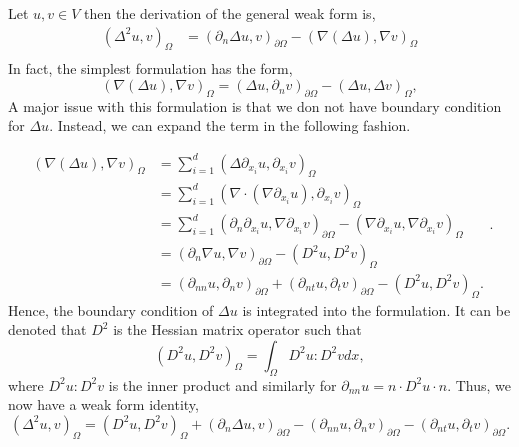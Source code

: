Let $u,v \in  V$ then the derivation of the general weak form is,
\[
\begin{split}
\left( \Delta ^2 u,v \right) _{\Omega }  &  = \left( \partial _{n} \Delta u, v \right) _{\partial \Omega } - \left( \nabla \left( \Delta  u \right) , \nabla v \right) _{\Omega }  \\
\end{split}
\]
In fact, the simplest formulation has the form,
\[
  \left( \nabla \left( \Delta u \right) , \nabla v \right) _{\Omega } =   \left( \Delta u, \partial _{n} v \right) _{\partial \Omega } - \left( \Delta u, \Delta v \right)_{\Omega },
\]
A major issue with this formulation is that we don not have boundary condition for $\Delta u$. Instead, we can expand the term in the following fashion.

\begin{equation*}
    \begin{split}
\left( \nabla \left( \Delta u \right) , \nabla v \right) _{\Omega } & = \sum_{i = 1}^{ d}  \left( \Delta  \partial _{x_{i}} u, \partial _{x_{i}}v \right) _{\Omega }  \\
&= \sum_{i = 1}^{d}  \left( \nabla \cdot \left( \nabla \partial _{x_{i}} u \right) , \partial _{x_{i}} v \right)_{\Omega }  \\
&= \sum_{i = 1}^{d}  \left( \partial_n  \partial _{x_{i}} u, \nabla  \partial _{x_{i}} v \right) _{\partial \Omega} -   \left( \nabla \partial _{x_{i}} u, \nabla \partial _{x_{i}} v \right)_{\Omega }  \\
&= \left(  \partial_n\nabla u, \nabla v \right) _{\partial \Omega } - \left( D^2 u, D^2v \right) _{\Omega } \\
&= \left( \partial _{nn} u, \partial _{n} v  \right)_{\partial \Omega }   + \left( \partial _{nt} u, \partial _{t} v \right) _{\partial \Omega } - \left( D^2u, D^2v \right) _{\Omega } .
    \end{split}
.\end{equation*}
Hence, the boundary condition of $\Delta u$ is integrated into the formulation.  It can be denoted that $D^2$ is the Hessian matrix operator such that
$$( D^2u, D^2v )_{\Omega } = \int_{\Omega }^{} D^{2}u : D^2v  dx,$$
where $D^2u:D^2v$ is the inner product and similarly for $\partial _{nn} u = n\cdot D^2 u \cdot n$. Thus, we now have a weak form identity,
\begin{equation}
\label{eq:weak_form_identity}
\left( \Delta ^2 u, v \right) _{ \Omega } = \left( D^2u, D^2v \right) _{\Omega} +   \left( \partial _{n} \Delta u, v  \right) _{\partial \Omega }  - (\partial _{nn} u, \partial _{n} v )_{\partial \Omega } - \left( \partial _{nt} u, \partial _{t}v
\right) _{\partial \Omega }
.\end{equation}

